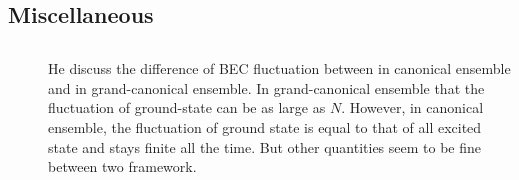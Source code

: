 \subsection{Miscellaneous}
\subsection{}
\begin{description}
\item[\cite{Politzer}]He discuss the difference of BEC fluctuation between in canonical ensemble and in grand-canonical ensemble.  In grand-canonical ensemble that the fluctuation of ground-state can be as large as $N$.  However, in canonical ensemble, the fluctuation of ground state is equal to that of all excited state and stays finite all the time.  But other quantities seem to be fine between two framework.  
\end{description}
